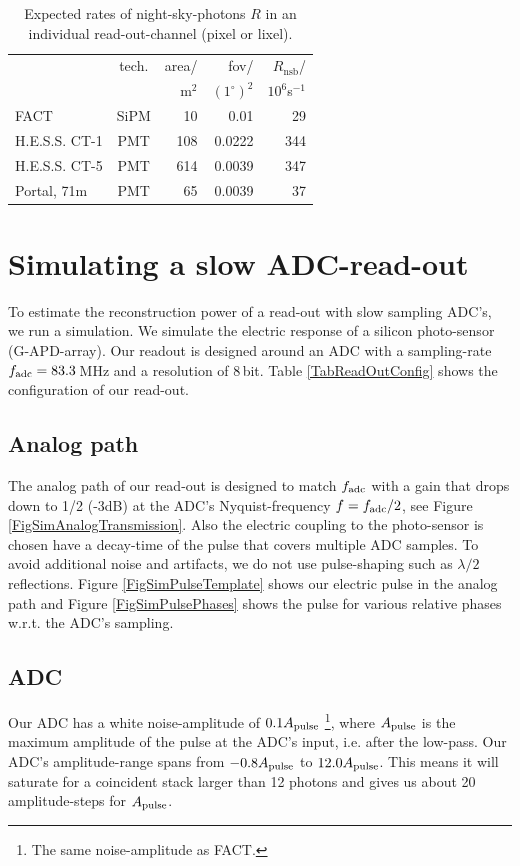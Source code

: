 \documentclass{article}%
\begin{document}
\begin{multicols}{2}
\begin{table}[H]
\begin{center}
    \begin{tabular}{lcrrr}
        &tech.& area/ & fov/&$R_\text{nsb}$/\\
        &     & m$^2$ & $(1^\circ)^{2}$&$10^6$s$^{-1}$\\
      \hline
      FACT &SiPM& 10 & 0.01 & 29\\
      H.E.S.S. CT-1 &PMT& 108 & 0.0222 & 344\\
      H.E.S.S. CT-5 &PMT& 614 & 0.0039 & 347\\
      Portal, 71m &PMT& 65 & 0.0039 & 37\\
    \end{tabular}
    \caption{Expected rates of night-sky-photons $R$ in an individual read-out-channel (pixel or lixel).}
    \label{TabInstrumentsNsbRates}
  \end{center}
\end{table}
%
\section*{Simulating a slow ADC-read-out}%
\label{SecSimulating}%
%
To estimate the reconstruction power of a read-out with slow sampling ADC's, we run a simulation.
%
We simulate the electric response of a silicon photo-sensor (G-APD-array).
%
Our readout is designed around an ADC with a sampling-rate $f_\text{adc}{}=83.3$\,MHz and a resolution of 8\,bit.
%
Table \ref{TabReadOutConfig} shows the configuration of our read-out.
%
\subsection*{Analog path}%
%
The analog path of our read-out is designed to match $f_\text{adc}{}$ with a gain that drops down to 1/2 (-3dB) at the ADC's Nyquist-frequency $f = f_\text{adc}{}/2$, see Figure \ref{FigSimAnalogTransmission}.
%
Also the electric coupling to the photo-sensor is chosen have a decay-time of the pulse that covers multiple ADC samples.
%
To avoid additional noise and artifacts, we do not use pulse-shaping such as $\lambda /2$ reflections.
%
Figure \ref{FigSimPulseTemplate} shows our electric pulse in the analog path and Figure \ref{FigSimPulsePhases} shows the pulse for various relative phases w.r.t. the ADC's sampling.
%
\subsection*{ADC}%
%
Our ADC has a white noise-amplitude of $0.1A_\text{pulse}{}$ \footnote{The same noise-amplitude as FACT.}, where $A_\text{pulse}{}$ is the maximum amplitude of the pulse at the ADC's input, i.e. after the low-pass.
%
Our ADC's amplitude-range spans from $-0.8A_\text{pulse}{}$ to $12.0A_\text{pulse}{}$. This means it will saturate for a coincident stack larger than 12 photons and gives us about 20 amplitude-steps for $A_\text{pulse}{}$.
%

\end{multicols}
\end{document}
